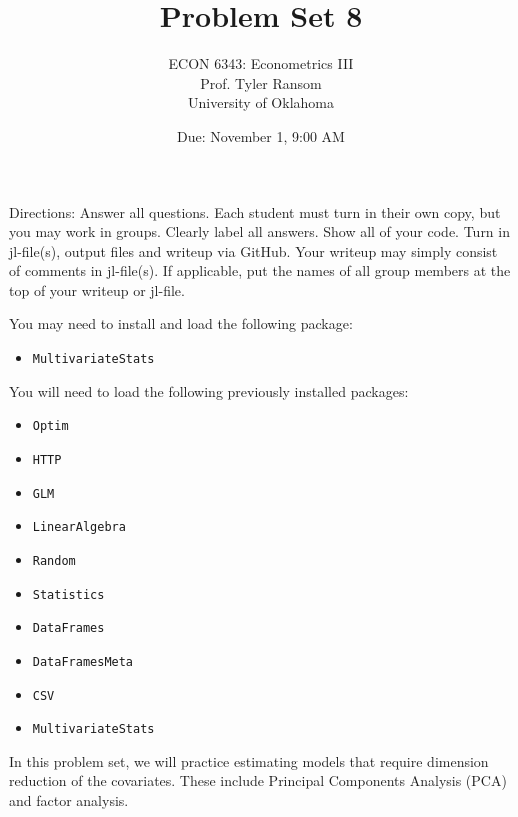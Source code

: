 \documentclass[12pt,english]{article}
\begin{document}
\title{Problem Set 8}
\author{ECON 6343: Econometrics III\\
Prof. Tyler Ransom\\
University of Oklahoma}
\date{Due: November 1, 9:00 AM}

\maketitle
Directions: Answer all questions. Each student must turn in their own copy, but you may work in groups. Clearly label all answers. Show all of your code. Turn in jl-file(s), output files and writeup via GitHub. Your writeup may simply consist of comments in jl-file(s). If applicable, put the names of all group members at the top of your writeup or jl-file.

You may need to install and load the following package:
\begin{itemize}
 \item[~] \texttt{MultivariateStats}
\end{itemize}

You will need to load the following previously installed packages:
\begin{itemize}
    \item[~] \texttt{Optim} 
    \item[~] \texttt{HTTP} 
    \item[~] \texttt{GLM} 
    \item[~] \texttt{LinearAlgebra} 
    \item[~] \texttt{Random} 
    \item[~] \texttt{Statistics} 
    \item[~] \texttt{DataFrames} 
    \item[~] \texttt{DataFramesMeta} 
    \item[~] \texttt{CSV} 
    \item[~] \texttt{MultivariateStats} 
\end{itemize}
\pagebreak
In this problem set, we will practice estimating models that require dimension reduction of the covariates. These include Principal Components Analysis (PCA) and factor analysis.
\end{document}
